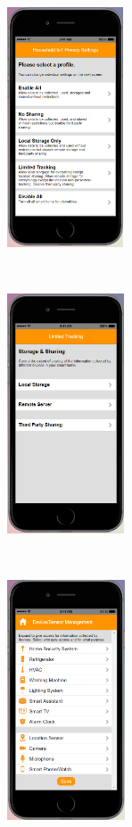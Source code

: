 \begin{figure}[htb]
	\centering
	\begin{subfigure}[t]{0.2\textwidth}
		\centering
		\includegraphics[height=2.8in]{figures/ui2sp1.png}
	\end{subfigure}%
	~~~~~
	\begin{subfigure}[t]{0.2\textwidth}
		\centering
		\includegraphics[height=2.8in]{figures/ui2sp2.png}
	\end{subfigure}%
	~~~~~
	\begin{subfigure}[t]{0.2\textwidth}
		\centering
		\includegraphics[height=2.8in]{figures/ui1sp3.png}

\end{subfigure}
\end{figure}

